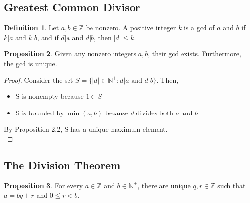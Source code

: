 \documentclass[14pt]{article}
\theoremstyle{definition}
\newtheorem{definition}{Definition}[subsection]
\newtheorem{proposition}[definition]{Proposition}
\begin{document}
\subsection{Greatest Common Divisor}

\begin{definition}
    Let $a,b\in \mathbb{Z}$ be nonzero. A positive integer $k$ is a gcd of $a$ and $b$ if $k|a$ and $k|b$, and if $d|a$ and $d|b$, then $|d|\leq k$.
\end{definition}

\vspace{2mm} %

 \begin{proposition}
     Given any nonzero integers $a,b$, their gcd exists. Furthermore, the gcd is unique.
 \end{proposition}

\begin{proof}
    Consider the set $S=\{|d|\in \mathbb{N}^+\colon d|a \text{ and } d|b\}$. Then,
    \begin{itemize}
        \item S is nonempty because $1\in S$
        \item S is bounded by $\min(a,b)$ because $d$ divides both $a$ and $b$
    \end{itemize}
    By Proposition 2.2, S has a unique maximum element.\\
\end{proof}

\vspace{5mm} %

\subsection{The Division Theorem}
\begin{proposition}
For every $a\in \mathbb{Z}$ and $b\in \mathbb{N}^+$, there are unique $q,r\in \mathbb{Z} $ such that $a=bq+r$ and $0\leq r <b$.
\end{proposition}
\end{document}
